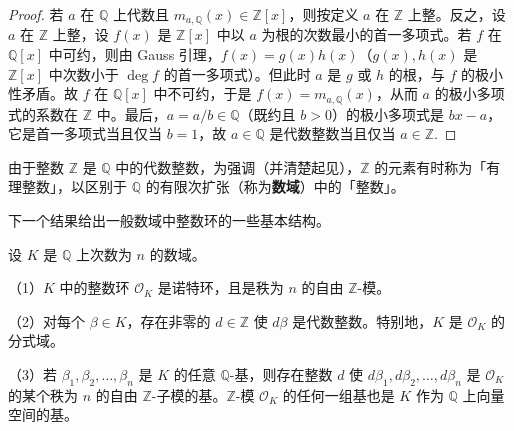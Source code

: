 \begin{proof}
若 \(a\) 在 \(\mathbb{Q}\) 上代数且 \(m_{a,\mathbb{Q}}(x) \in \mathbb{Z}[x]\)，则按定义 \(a\) 在 \(\mathbb{Z}\) 上整。反之，设 \(a\) 在 \(\mathbb{Z}\) 上整，设 \(f(x)\) 是 \(\mathbb{Z}[x]\) 中以 \(a\) 为根的次数最小的首一多项式。若 \(f\) 在 \(\mathbb{Q}[x]\) 中可约，则由 Gauss 引理，\(f(x) = g(x)h(x)\)（\(g(x), h(x)\) 是 \(\mathbb{Z}[x]\) 中次数小于 \(\deg f\) 的首一多项式）。但此时 \(a\) 是 \(g\) 或 \(h\) 的根，与 \(f\) 的极小性矛盾。故 \(f\) 在 \(\mathbb{Q}[x]\) 中不可约，于是 \(f(x) = m_{a,\mathbb{Q}}(x)\)，从而 \(a\) 的极小多项式的系数在 \(\mathbb{Z}\) 中。最后，\(a = a/b \in \mathbb{Q}\)（既约且 \(b > 0\)）的极小多项式是 \(bx-a\)，它是首一多项式当且仅当 \(b = 1\)，故 \(a \in \mathbb{Q}\) 是代数整数当且仅当 \(a \in \mathbb{Z}\).
\end{proof}

由于整数 \(\mathbb{Z}\) 是 \(\mathbb{Q}\) 中的代数整数，为强调（并清楚起见），\(\mathbb{Z}\) 的元素有时称为「有理整数」，以区别于 \(\mathbb{Q}\) 的有限次扩张（称为\textbf{数域}）中的「整数」。

下一个结果给出一般数域中整数环的一些基本结构。

\begin{theorem}\label{thm:15.29}
设 \(K\) 是 \(\mathbb{Q}\) 上次数为 \(n\) 的数域。

（1）\(K\) 中的整数环 \(\mathcal{O}_K\) 是诺特环，且是秩为 \(n\) 的自由 \(\mathbb{Z}\)-模。

（2）对每个 \(\beta \in K\)，存在非零的 \(d \in \mathbb{Z}\) 使 \(d\beta\) 是代数整数。特别地，\(K\) 是 \(\mathcal{O}_K\) 的分式域。

（3）若 \(\beta_1, \beta_2, \ldots, \beta_n\) 是 \(K\) 的任意 \(\mathbb{Q}\)-基，则存在整数 \(d\) 使 \(d\beta_1, d\beta_2, \ldots, d\beta_n\) 是 \(\mathcal{O}_K\) 的某个秩为 \(n\) 的自由 \(\mathbb{Z}\)-子模的基。\(\mathbb{Z}\)-模 \(\mathcal{O}_K\) 的任何一组基也是 \(K\) 作为 \(\mathbb{Q}\) 上向量空间的基。
\end{theorem}

